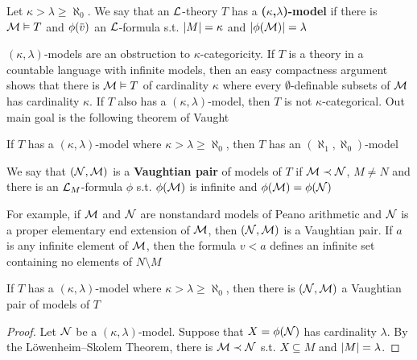 \documentclass[11pt]{article}
\begin{document}
\begin{definition}[]
Let \(\kappa>\lambda\ge\aleph_0\). We say that an \(\mathcal{L}\)-theory \(T\) has a \textbf{(\(\kappa\),\(\lambda\))-model} if there
is \(\mathcal{M}\vDash T\) and \(\phi(\barv)\) an \(\mathcal{L}\)-formula s.t. \(\abs{M}=\kappa\) and \(\abs{\phi(\calm)}=\lambda\)
\end{definition}

\((\kappa,\lambda)\)-models are an obstruction to \(\kappa\)-categoricity. If \(T\) is a theory in a countable
language with infinite models, then an easy compactness argument shows that there is \(\mathcal{M}\vDash T\) of
cardinality \(\kappa\) where every \(\emptyset\)-definable subsets of \(\mathcal{M}\) has cardinality \(\kappa\).
If \(T\) also has a \((\kappa,\lambda)\)-model,
then \(T\) is not \(\kappa\)-categorical. Out main goal is the following theorem of Vaught

\begin{theorem}[]
\label{thm4.3.34}
If \(T\) has a \((\kappa,\lambda)\)-model where \(\kappa>\lambda\ge\aleph_0\), then \(T\) has an \((\aleph_1,\aleph_0)\)-model
\end{theorem}

\begin{definition}[]
We say that \((\mathcal{N},\mathcal{M})\) is a \textbf{Vaughtian pair} of models of \(T\) if \(\mathcal{M}\prec\mathcal{N}\), \(M\neq N\) and there is
an \(\mathcal{L}_M\)-formula \(\phi\) s.t. \(\phi(\mathcal{M})\) is infinite and  \(\phi(\mathcal{M})=\phi(\mathcal{N})\)
\end{definition}

For example, if \(\mathcal{M}\) and \(\mathcal{N}\) are nonstandard models of Peano arithmetic and \(\mathcal{N}\) is a proper
elementary end extension of \(\mathcal{M}\), then \((\mathcal{N},\mathcal{M})\) is a Vaughtian pair. If \(a\) is any infinite
element of \(\mathcal{M}\), then the formula \(v<a\) defines an infinite set containing no elements
of \(N\setminus M\)

\begin{lemma}[]
If \(T\) has a \((\kappa,\lambda)\)-model where \(\kappa>\lambda\ge\aleph_0\), then there is \((\mathcal{N},\mathcal{M})\) a Vaughtian pair of
models of \(T\)
\end{lemma}

\begin{proof}
Let \(\mathcal{N}\) be a \((\kappa,\lambda)\)-model. Suppose that \(X=\phi(\mathcal{N})\) has cardinality \(\lambda\). By the
Löwenheim–Skolem Theorem, there is \(\mathcal{M}\prec\mathcal{N}\) s.t. \(X\subseteq M\) and \(\abs{M}=\lambda\).
\end{proof}
\end{document}
